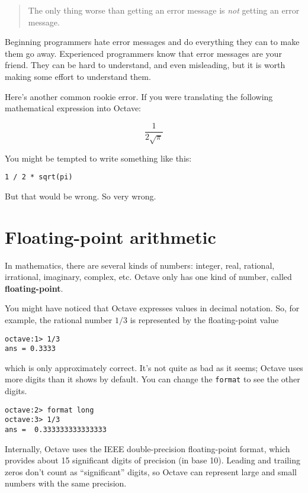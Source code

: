 \begin{quote}
The only thing worse than getting an error message is {\em not}
getting an error message.
\end{quote}

Beginning programmers hate error messages and do everything they
can to make them go away. Experienced programmers know that error
messages are your friend. They can be hard to understand, and even
misleading, but it is worth making some effort to understand them.

Here's another common rookie error. If you were translating
the following mathematical
expression into Octave:

\[ \frac{1}{2 \sqrt \pi}\]

You might be tempted to write something like this:

\begin{verbatim}
1 / 2 * sqrt(pi)
\end{verbatim}

But that would be wrong. So very wrong.


\section{Floating-point arithmetic}

In mathematics, there are several kinds of numbers: integer, real,
rational, irrational, imaginary, complex, etc. Octave only has one
kind of number, called {\bf floating-point}.

You might have noticed that Octave expresses values in decimal
notation. So, for example, the rational number $1/3$ is represented
by the floating-point value

\begin{verbatim}
octave:1> 1/3
ans = 0.3333
\end{verbatim}

which is only approximately correct. It's not quite as bad as
it seems; Octave uses more digits than it shows by default.
You can change the {\tt format} to see the other digits.

\begin{verbatim}
octave:2> format long
octave:3> 1/3
ans =  0.333333333333333
\end{verbatim}

Internally, Octave uses the IEEE double-precision floating-point
format, which provides about 15 significant digits of precision (in
base 10). Leading and trailing zeros don't count as ``significant''
digits, so Octave can represent large and small numbers
with the same precision.

